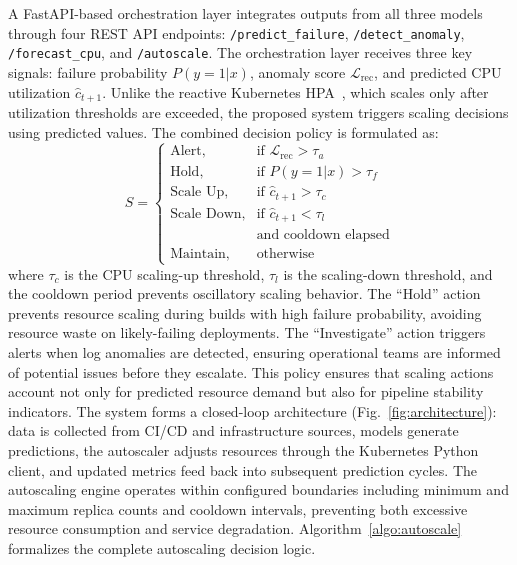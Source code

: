 \documentclass[a4paper,fleqn]{cas-dc}
\begin{document}
A FastAPI-based orchestration layer integrates outputs from all three models through four REST API endpoints: \texttt{/predict\_failure}, \texttt{/detect\_anomaly}, \texttt{/forecast\_cpu}, and \texttt{/autoscale}.
The orchestration layer receives three key signals: failure probability $P(y=1|x)$, anomaly score $\mathcal{L}_{\mathrm{rec}}$, and predicted CPU utilization $\hat{c}_{t+1}$.
Unlike the reactive Kubernetes HPA~\citep{kubernetesDocs}, which scales only after utilization thresholds are exceeded, the proposed system triggers scaling decisions using predicted values.
The combined decision policy is formulated as:
\begin{equation}\label{eq:policy}
S =
\begin{cases}
\text{Alert}, & \text{if } \mathcal{L}_{\mathrm{rec}} > \tau_a \\
\text{Hold}, & \text{if } P(y=1|x) > \tau_f \\
\text{Scale Up}, & \text{if } \hat{c}_{t+1} > \tau_c \\
\text{Scale Down}, & \text{if } \hat{c}_{t+1} < \tau_l \\
              & \text{and cooldown elapsed} \\
\text{Maintain}, & \text{otherwise}
\end{cases}
\end{equation}
where $\tau_c$ is the CPU scaling-up threshold, $\tau_l$ is the scaling-down threshold, and the cooldown period prevents oscillatory scaling behavior.
The ``Hold'' action prevents resource scaling during builds with high failure probability, avoiding resource waste on likely-failing deployments.
The ``Investigate'' action triggers alerts when log anomalies are detected, ensuring operational teams are informed of potential issues before they escalate.
This policy ensures that scaling actions account not only for predicted resource demand but also for pipeline stability indicators.
The system forms a closed-loop architecture (Fig.~\ref{fig:architecture}): data is collected from CI/CD and infrastructure sources, models generate predictions, the autoscaler adjusts resources through the Kubernetes Python client, and updated metrics feed back into subsequent prediction cycles.
The autoscaling engine operates within configured boundaries including minimum and maximum replica counts and cooldown intervals, preventing both excessive resource consumption and service degradation.
Algorithm~\ref{algo:autoscale} formalizes the complete autoscaling decision logic.
\end{document}
